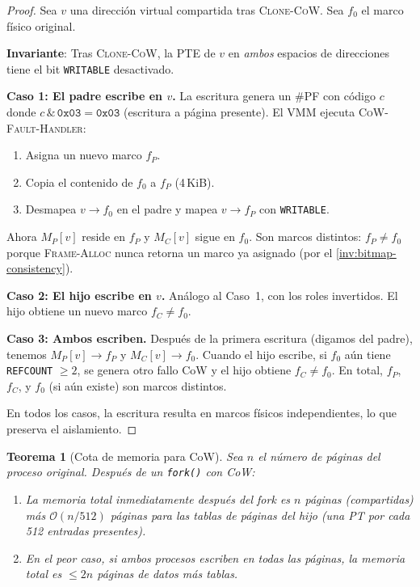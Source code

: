 \documentclass[11pt,twoside,openright]{book}
\theoremstyle{definition}
\theoremstyle{plain}
\newtheorem{theorem}{Teorema}[chapter]
\theoremstyle{remark}
\newcommand{\bigO}{\mathcal{O}}
\begin{document}
\begin{proof}
Sea $v$ una dirección virtual compartida tras \textsc{Clone-CoW}. Sea $f_0$ el
marco físico original.

\textbf{Invariante}: Tras \textsc{Clone-CoW}, la PTE de $v$ en \emph{ambos}
espacios de direcciones tiene el bit \texttt{WRITABLE} desactivado.

\textbf{Caso 1: El padre escribe en $v$.} La escritura genera un \#PF con
código $c$ donde $c \,\texttt{\&}\, \texttt{0x03} = \texttt{0x03}$ (escritura a
página presente). El VMM ejecuta \textsc{CoW-Fault-Handler}:
\begin{enumerate}
    \item Asigna un nuevo marco $f_P$.
    \item Copia el contenido de $f_0$ a $f_P$ (4\,KiB).
    \item Desmapea $v \to f_0$ en el padre y mapea $v \to f_P$ con \texttt{WRITABLE}.
\end{enumerate}
Ahora $M_P[v]$ reside en $f_P$ y $M_C[v]$ sigue en $f_0$. Son marcos distintos:
$f_P \neq f_0$ porque \textsc{Frame-Alloc} nunca retorna un marco ya asignado
(por el \cref{inv:bitmap-consistency}).

\textbf{Caso 2: El hijo escribe en $v$.} Análogo al Caso~1, con los roles
invertidos. El hijo obtiene un nuevo marco $f_C \neq f_0$.

\textbf{Caso 3: Ambos escriben.} Después de la primera escritura (digamos del
padre), tenemos $M_P[v] \to f_P$ y $M_C[v] \to f_0$. Cuando el hijo escribe,
si $f_0$ aún tiene \texttt{REFCOUNT} $\geq 2$, se genera otro fallo CoW
y el hijo obtiene $f_C \neq f_0$. En total, $f_P$, $f_C$, y $f_0$ (si aún
existe) son marcos distintos.

En todos los casos, la escritura resulta en marcos físicos independientes, lo
que preserva el aislamiento. \qedhere
\end{proof}

\begin{theorem}[Cota de memoria para CoW]
\label{thm:cow-memory}
Sea $n$ el número de páginas del proceso original. Después de un \texttt{fork()}
con CoW:
\begin{enumerate}
    \item La memoria total inmediatamente después del fork es $n$ páginas
          (compartidas) más $\bigO(n/512)$ páginas para las tablas de páginas
          del hijo (una PT por cada 512 entradas presentes).
    \item En el peor caso, si ambos procesos escriben en todas las páginas,
          la memoria total es $\leq 2n$ páginas de datos más tablas.
\end{enumerate}
\end{theorem}
\end{document}
